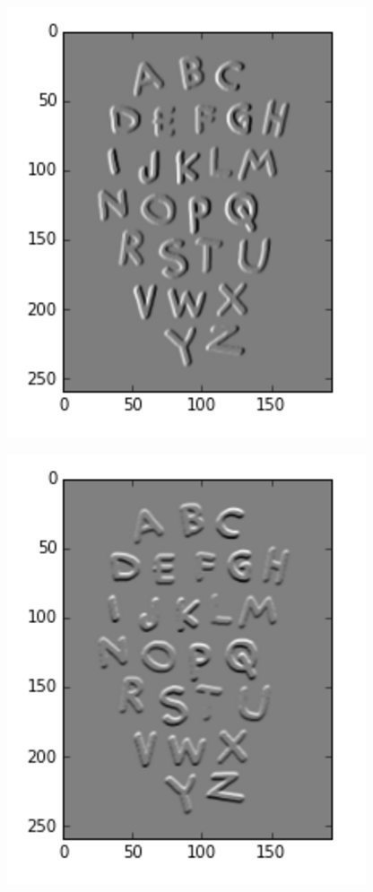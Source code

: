 \documentclass{article}
\begin{document}
		\begin{figure}[H]
			\begin{minipage}{.5\textwidth}
				\centering
				\includegraphics[width=0.6\linewidth]{images/sobel_x.png}
				\label{fig:test6}
			\end{minipage}
			\begin{minipage}{.5\textwidth}
				\centering
				\includegraphics[width=0.6\linewidth]{images/sobel_y.png}
				\label{fig:test7}
			\end{minipage}
		\end{figure}
\end{document}
